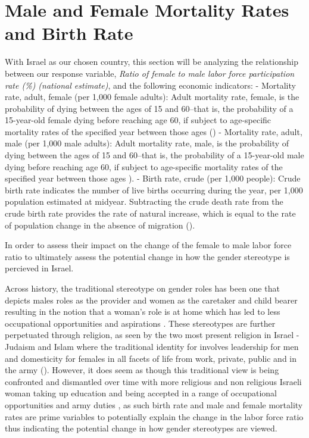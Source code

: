 \documentclass[11pt,a4paper,]{article}
\begin{document}
\section*{Male and Female Mortality Rates and Birth Rate}

With Israel as our chosen country, this section will be analyzing the relationship between our response variable, \emph{Ratio of female to male labor force participation rate (\%) (national estimate)}, and the following economic indicators:
- Mortality rate, adult, female (per 1,000 female adults): Adult mortality rate, female, is the probability of dying between the ages of 15 and 60--that is, the probability of a 15-year-old female dying before reaching age 60, if subject to age-specific mortality rates of the specified year between those ages (\textcite{TheWorldBank2018})
- Mortality rate, adult, male (per 1,000 male adults): Adult mortality rate, male, is the probability of dying between the ages of 15 and 60--that is, the probability of a 15-year-old male dying before reaching age 60, if subject to age-specific mortality rates of the specified year between those ages \textcite{TheWorldBank2018}).
- Birth rate, crude (per 1,000 people): Crude birth rate indicates the number of live births occurring during the year, per 1,000 population estimated at midyear. Subtracting the crude death rate from the crude birth rate provides the rate of natural increase, which is equal to the rate of population change in the absence of migration (\textcite{TheWorldBank2018}).

In order to assess their impact on the change of the female to male labor force ratio to ultimately assess the potential change in how the gender stereotype is percieved in Israel.

Across history, the traditional stereotype on gender roles has been one that depicts males roles as the provider and women as the caretaker and child bearer resulting in the notion that a woman's role is at home which has led to less occupational opportunities and aspirations \textcite{DickeAL2019}. These stereotypes are further perpetuated through religion, as seen by the two most present religion in Israel - Judaism and Islam where the traditional identity for involves leadership for men and domesticity for females \textcite{Woodhead} in all facets of life from work, private, public and in the army (\textcite{GittlemenSI2020}). However, it does seem as though this traditional view is being confronted and dismantled over time with more religious and non religious Israeli woman taking up education and being accepted in a range of occupational opportunities and army duties \textcite{Levy2006}, as such birth rate and male and female mortality rates are prime variables to potentially explain the change in the labor force ratio thus indicating the potential change in how gender stereotypes are viewed.
\end{document}
